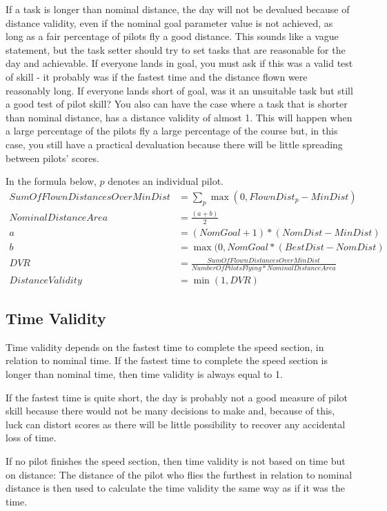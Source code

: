 \documentclass[gap.tex]{subfiles}
\begin{document}
If a task is longer than nominal distance, the day will not be devalued because
of distance validity, even if the nominal goal parameter value is not achieved,
as long as a fair percentage of pilots fly a good distance. This sounds like
a vague statement, but the task setter should try to set tasks that are
reasonable for the day and achievable. If everyone lands in goal, you must ask
if this was a valid test of skill - it probably was if the fastest time and the
distance flown were reasonably long. If everyone lands short of goal, was it an
unsuitable task but still a good test of pilot skill? You also can have the
case where a task that is shorter than nominal distance, has a distance
validity of almost 1. This will happen when a large percentage of the pilots
fly a large percentage of the course but, in this case, you still have
a practical devaluation because there will be little spreading between pilots’
scores.

In the formula below, \(p\) denotes an individual pilot.
\begin{align*}
    SumOfFlownDistancesOverMinDist &= \sum_p \max(0, FlownDist_p - MinDist) \\
    NominalDistanceArea &= \frac{(a + b)}{2} \\
    a &= (NomGoal + 1) * (NomDist - MinDist) \\
    b &= \max(0, NomGoal * (BestDist - NomDist) \\
    DVR &= \frac{SumOfFlownDistancesOverMinDist}{NumberOfPilotsFlying * NominalDistanceArea} \\
    DistanceValidity &= \min(1, DVR)
\end{align*}

\subsection{Time Validity}
Time validity depends on the fastest time to complete the speed section, in
relation to nominal time. If the fastest time to complete the speed section is
longer than nominal time, then time validity is always equal to 1.

If the fastest time is quite short, the day is probably not a good measure of
pilot skill because there would not be many decisions to make and, because of
this, luck can distort scores as there will be little possibility to recover
any accidental loss of time.

If no pilot finishes the speed section, then time validity is not based on time
but on distance: The distance of the pilot who flies the furthest in relation
to nominal distance is then used to calculate the time validity the same way as
if it was the time.
\end{document}
